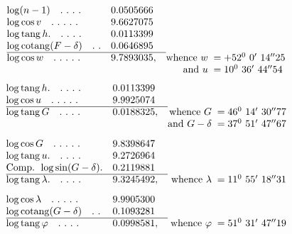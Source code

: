 \[
\begin{array}{@{}l@{\quad}r@{}l@{\quad}r@{\;}l@{}}
\log(n-1)\quad .\ .\ .\ .&0.0505666&&&\\
\log\cos v\quad .\ .\ .\ .\ .&9.6627075&&&\\
\log\operatorname{tang}h.\quad .\ .\ .\ .&0.0113399&&&\\
\log\operatorname{cotang}(F-\delta)\quad .\ .&0.0646895&&&\\\cline{1-3}
\log\cos w\quad .\ .\ .\ .\ .&9.7893035&,&\text{whence }w&{}=+52^0\ 0'\ 14''25\\
&&&\text{and }u&{}=10^0\ 36'\ 44''54
\end{array}
\]
\[
\begin{array}{@{}l@{\quad}r@{}l@{\quad}r@{\;}l@{}}
\log\operatorname{tang}h.\quad .\ .\ .\ .&0.0113399&&&\\
\log\cos u\quad .\ .\ .\ .\ .&9.9925074&&&\\\cline{1-3}
\log\operatorname{tang}G\quad .\ .\ .\ .&0.0188325&,&\text{whence }G&{}=46^0\ 14'\ 30''77\\
&&&\text{and }G-\delta&{}=37^0\ 51'\ 47''67\\[8pt]
\log\cos G\quad .\ .\ .\ .\ .&9.8398647&&&\\
\log\operatorname{tang}u.\quad .\ .\ .\ .&9.2726964&&&\\
\text{Comp. }\log\sin(G-\delta).&0.2119881&&&\\\cline{1-3}
\log\operatorname{tang}\lambda.\quad .\ .\ .\ .&9.3245492&,&\text{whence }\lambda&{}=11^0\ 55'\ 18''31\\[8pt]
\log\cos\lambda\quad .\ .\ .\ .\ .&9.9905300&&&\\
\log\operatorname{cotang}(G-\delta)\quad .\ .&0.1093281&&&\\\cline{1-3}
\log\operatorname{tang}\varphi\quad .\ .\ .\ .&0.0998581&,&\text{whence }\varphi&{}=51^0\ 31'\ 47''19
\end{array}
\]

